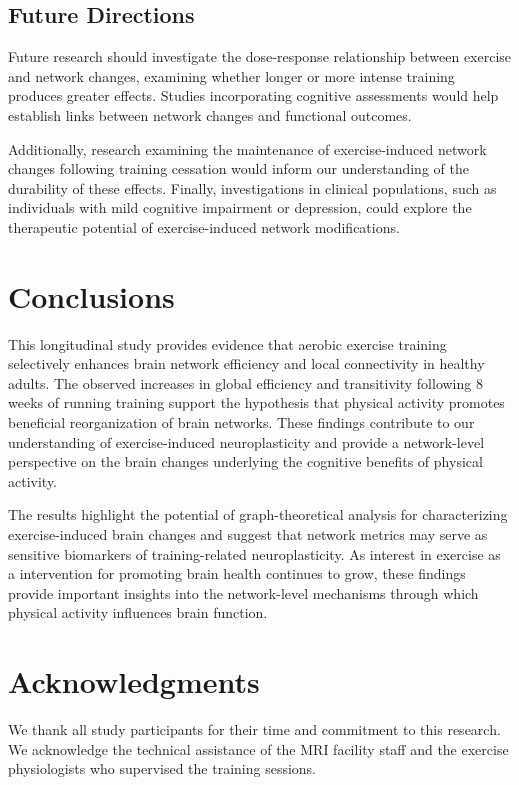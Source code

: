 \documentclass[12pt,a4paper]{article}
\begin{document}
\subsection{Future Directions}

Future research should investigate the dose-response relationship between exercise and network changes, examining whether longer or more intense training produces greater effects. Studies incorporating cognitive assessments would help establish links between network changes and functional outcomes.

Additionally, research examining the maintenance of exercise-induced network changes following training cessation would inform our understanding of the durability of these effects. Finally, investigations in clinical populations, such as individuals with mild cognitive impairment or depression, could explore the therapeutic potential of exercise-induced network modifications.

\section{Conclusions}

This longitudinal study provides evidence that aerobic exercise training selectively enhances brain network efficiency and local connectivity in healthy adults. The observed increases in global efficiency and transitivity following 8 weeks of running training support the hypothesis that physical activity promotes beneficial reorganization of brain networks. These findings contribute to our understanding of exercise-induced neuroplasticity and provide a network-level perspective on the brain changes underlying the cognitive benefits of physical activity.

The results highlight the potential of graph-theoretical analysis for characterizing exercise-induced brain changes and suggest that network metrics may serve as sensitive biomarkers of training-related neuroplasticity. As interest in exercise as a intervention for promoting brain health continues to grow, these findings provide important insights into the network-level mechanisms through which physical activity influences brain function.

\section*{Acknowledgments}

We thank all study participants for their time and commitment to this research. We acknowledge the technical assistance of the MRI facility staff and the exercise physiologists who supervised the training sessions.
\end{document}
